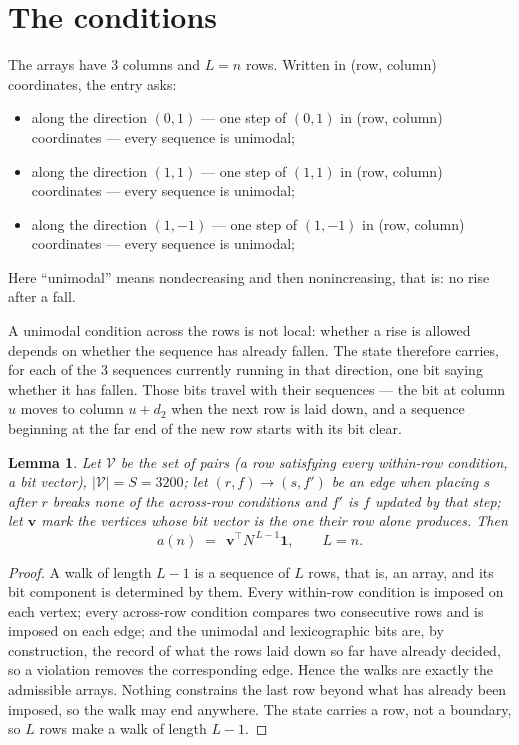 \documentclass[11pt,a4paper]{article}
\theoremstyle{plain}
\newtheorem{lemma}[theorem]{Lemma}
\theoremstyle{definition}
\begin{document}
\section{The conditions}

The arrays have $3$ columns and $L=n$ rows. Written in (row, column)
coordinates, the entry asks:
\begin{itemize}
\item along the direction $(0,1)$ --- one step of $(0,1)$ in (row, column) coordinates --- every sequence is unimodal;
\item along the direction $(1,1)$ --- one step of $(1,1)$ in (row, column) coordinates --- every sequence is unimodal;
\item along the direction $(1,-1)$ --- one step of $(1,-1)$ in (row, column) coordinates --- every sequence is unimodal;
\end{itemize}
Here ``unimodal'' means nondecreasing and then nonincreasing, that is: no rise after a fall.

A unimodal condition across the rows is not local: whether a
rise is allowed depends on whether the sequence has already fallen. The state therefore
carries, for each of the $3$ sequences currently running in that direction, one bit saying
whether it has fallen. Those bits travel with their sequences --- the bit at column $u$
moves to column $u+d_2$ when the next row is laid down, and a sequence beginning at the
far end of the new row starts with its bit clear.

\begin{lemma}\label{lem:walk}
Let $\mathcal V$ be the set of pairs (a row satisfying every within-row condition, a
bit vector), $|\mathcal V|=S=3200$; let $(r,f)\to(s,f')$ be an edge when placing $s$ after $r$
breaks none of the across-row conditions and $f'$ is $f$ updated by that step; let
$\mathbf{v}$ mark the vertices whose bit vector is the one their row alone produces.
Then
\[
a(n)\;=\;\,\mathbf{v}^{\!\top}N^{\,L-1}\mathbf{1},\qquad L=n.
\]
\end{lemma}

\begin{proof}
A walk of length $L-1$ is a sequence of $L$ rows, that is, an array, and its bit component
is determined by them. Every within-row condition is imposed on each vertex; every
across-row condition compares two consecutive rows and is imposed on each edge; and the
unimodal and lexicographic bits are, by construction, the record of what the rows laid down
so far have already decided, so a violation removes the corresponding edge. Hence the walks
are exactly the admissible arrays. Nothing constrains the last row beyond what has already
been imposed, so the walk may end anywhere. The state carries a row, not a boundary, so
$L$ rows make a walk of length $L-1$.
\end{proof}
\end{document}
